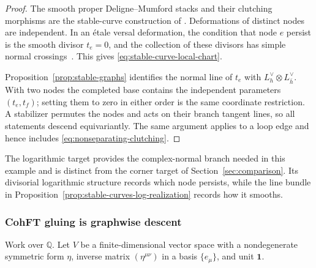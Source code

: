 \documentclass[11pt,letterpaper,twoside]{article}
\theoremstyle{plain}
\theoremstyle{definition}
\theoremstyle{remark}
\let\cite\citep
\newcommand{\namecite}[2]{\citet{#2}}
\begin{document}
\begin{proof}
The smooth proper Deligne--Mumford stacks and their clutching morphisms are the stable-curve construction of \namecite{Deligne--Mumford and Knudsen}{delignemumford1969,knudsen1983}.  Deformations of distinct nodes are independent.  In an \'etale versal deformation, the condition that node \(e\) persist is the smooth divisor \(t_e=0\), and the collection of these divisors has simple normal crossings~\cite{acg2011,abramovich2015}.  This gives \eqref{eq:stable-curve-local-chart}.

Proposition~\ref{prop:stable-graphs} identifies the normal line of \(t_e\) with \(L_h^\vee\otimes L_{\bar h}^\vee\).  With two nodes the completed base contains the independent parameters \((t_e,t_f)\); setting them to zero in either order is the same coordinate restriction.  A stabilizer permutes the nodes and acts on their branch tangent lines, so all statements descend equivariantly.  The same argument applies to a loop edge and hence includes \eqref{eq:nonseparating-clutching}.
\end{proof}

The logarithmic target provides the complex-normal branch needed in this example and is distinct from the corner target of Section~\ref{sec:comparison}.  Its divisorial logarithmic structure records which node persists, while the line bundle in Proposition~\ref{prop:stable-curves-log-realization} records how it smooths.

\subsubsection{CohFT gluing is graphwise descent}

Work over \(\mathbb Q\).  Let \(V\) be a finite-dimensional vector space with a nondegenerate symmetric form \(\eta\), inverse matrix \((\eta^{\mu\nu})\) in a basis \(\{e_\mu\}\), and unit \(\mathbf 1\).
\end{document}
